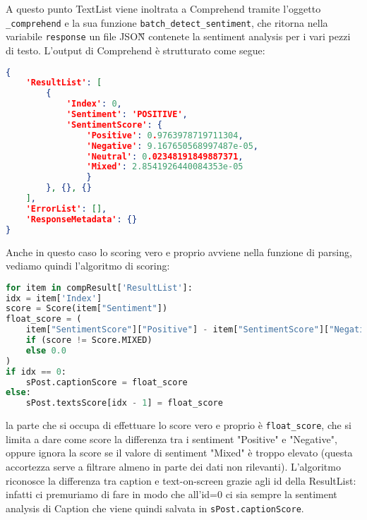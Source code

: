 A questo punto TextList viene inoltrata a Comprehend tramite l'oggetto \verb+_comprehend+ e la sua
funzione \verb+batch_detect_sentiment+, che ritorna nella variabile \verb+response+ un file JSON\G{}
contenete la sentiment analysis per i vari pezzi di testo. 
L'output di Comprehend è strutturato come segue:
\begin{lstlisting}[language=JSON]
{
    'ResultList': [
        {
            'Index': 0, 
            'Sentiment': 'POSITIVE', 
            'SentimentScore': {
                'Positive': 0.9763978719711304, 
                'Negative': 9.167650568997487e-05, 
                'Neutral': 0.02348191849887371, 
                'Mixed': 2.8541926440084353e-05
                }
        }, {}, {}
    ], 
    'ErrorList': [], 
    'ResponseMetadata': {}
}
\end{lstlisting}
Anche in questo caso lo scoring vero e proprio avviene nella funzione di parsing, vediamo quindi
l'algoritmo di scoring:
\begin{lstlisting}[language=Python]
for item in compResult['ResultList']:
idx = item['Index']
score = Score(item["Sentiment"])
float_score = (
    item["SentimentScore"]["Positive"] - item["SentimentScore"]["Negative"]
    if (score != Score.MIXED)
    else 0.0
)
if idx == 0:
    sPost.captionScore = float_score
else:
    sPost.textsScore[idx - 1] = float_score
\end{lstlisting}
la parte che si occupa di effettuare lo score vero e proprio è \verb+float_score+, che si limita
a dare come score la differenza tra i sentiment "Positive" e "Negative", oppure ignora la score se 
il valore di sentiment "Mixed" è troppo elevato (questa accortezza serve a filtrare almeno in parte
dei dati non rilevanti).
L'algoritmo riconosce la differenza tra caption e text-on-screen grazie agli id
della ResultList: infatti ci premuriamo di fare in modo che all'id=0 ci sia sempre la sentiment 
analysis di Caption che viene quindi salvata in \verb+sPost.captionScore+.

